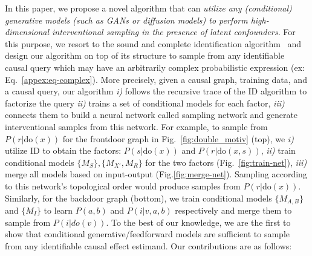 \documentclass{article}
\newcommand{\Do}{\text{do}}
\newcommand{\idgen}{\text{ID-GEN}\xspace}
\theoremstyle{plain}
\theoremstyle{definition}
\theoremstyle{remark}
\begin{document}
\par 
In this paper, we propose a novel algorithm \idgen that can \emph{utilize any (conditional) generative models (such as GANs or diffusion models) to perform high-dimensional interventional sampling in the presence of latent confounders.}
%
For this purpose, we resort to the sound and complete identification algorithm~\citep{tian2002studies,shpitser2008complete} and design our algorithm on top of its structure to sample from any identifiable
causal query which may have an arbitrarily complex probabilistic expression (ex: Eq.~\ref{appex:eq-complex}).
%
More precisely, given a causal graph, training data, and a causal query, our algorithm \textit{i)} follows the recursive trace of the ID algorithm to factorize the query \textit{ii)} trains a set of conditional models for each factor, \textit{iii)} connects them to build a neural network called sampling network and generate interventional samples from this network. 
For example, to sample from $P(r|\Do(x))$ for the frontdoor graph in Fig.~\ref{fig:double_motiv} (top), we \textit{i)} utilize ID to obtain the factors: $P(s| \Do(x))$ and
 $P(r|\Do(x,s))$, 
\textit{ii)} train conditional models $ \{ M_{S}\},  \{M_{X'}, M_{R}\} $ for the two factors (Fig.~\ref{fig:train-net}), \textit{iii)} merge all models based on input-output (Fig.\ref{fig:merge-net}). Sampling according to this network's topological order would produce samples from $P(r|\Do(x))$.
Similarly, for the backdoor graph (bottom), we train conditional models $\{M_{A,B}\}$ and $\{M_{I}\}$ to learn $P(a,b)$ and $P(i|v,a,b)$ respectively and merge them to sample from $P(i|do(v))$. 
%
%
%
To the best of our knowledge,
we are the first to show that conditional generative/feedforward models are sufficient to sample from any identifiable
causal effect estimand. Our contributions are as follows:
\end{document}
